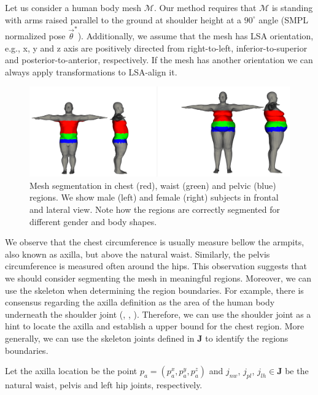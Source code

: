 \documentclass[runningheads, orivec]{llncs}
\begin{document}
Let us consider a human body mesh $\mathcal{M}$. Our method requires that 
$\mathcal{M}$ is standing with arms raised 
parallel to the 
ground at shoulder height at a $90^\circ$ angle (SMPL normalized pose
$\vec{\theta}^*$). Additionally, we assume that the mesh 
has LSA orientation, e.g., x, y and z axis are positively directed from 
right-to-left, inferior-to-superior and posterior-to-anterior, respectively. If 
the mesh has another orientation we can always apply transformations to 
LSA-align it.

\begin{figure}[t]
	\begin{center}
		\includegraphics[width=\linewidth]{subjects_2_6_calvis_segmented.png}
	\end{center}
	\caption{Mesh segmentation in chest (red), waist (green) and pelvic (blue) 
	regions. We show male (left) and female (right) subjects in frontal and 
	lateral view. Note how the regions are correctly segmented for different 
	gender and body shapes.}
	\label{fig:mesh_segmented}
\end{figure}

We observe that the chest circumference is usually measure bellow the armpits, 
also known as axilla, but above the natural waist. Similarly, the pelvis 
circumference is measured often around the hips. This observation suggests that 
we should consider segmenting the mesh in meaningful regions. Moreover, we can 
use the skeleton when determining the region boundaries. For 
example, there is consensus regarding the axilla 
definition as the area of the human body underneath the shoulder joint 
(\cite{MeSH.axilla}, \cite{FMA.axilla}, \cite{TA.axilla}). Therefore, we can 
use the shoulder joint as a hint to locate the axilla and establish a upper 
bound for the chest region. More generally, we can use the 
skeleton joints defined in $\mathbf{J}$ to identify the regions boundaries.

Let the axilla location be the point $p_a = (p^x_a, p^y_a, p^z_a)$ and 
$j_{nw}$, $j_{pl}$, 
$j_{lh} \in \mathbf{J}$ be the natural waist, pelvis and left hip joints, 
respectively.
\end{document}
